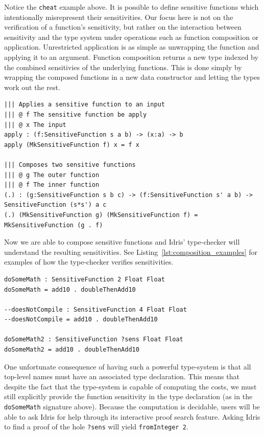 \documentclass[12pt]{article}
\begin{document}
Notice the \texttt{cheat} example above.
It is possible to define sensitive functions which intentionally misrepresent their sensitivities.
Our focus here is not on the verification of a function's sensitivity, but rather on the interaction between sensitivity and the type system under operations such as function composition or application.
Unrestricted application is as simple as unwrapping the function and applying it to an argument.
Function composition returns a new type indexed by the combined sensitivies of the underlying functions.
This is done simply by wrapping the composed functions in a new data constructor and letting the types work out the rest.

\begin{lstlisting}
||| Applies a sensitive function to an input
||| @ f The sensitive function be apply
||| @ x The input
apply : (f:SensitiveFunction s a b) -> (x:a) -> b
apply (MkSensitiveFunction f) x = f x

||| Composes two sensitive functions
||| @ g The outer function
||| @ f The inner function
(.) : (g:SensitiveFunction s b c) -> (f:SensitiveFunction s' a b) -> SensitiveFunction (s*s') a c
(.) (MkSensitiveFunction g) (MkSensitiveFunction f) = MkSensitiveFunction (g . f)
\end{lstlisting}

Now we are able to compose sensitive functions and Idris' type-checker will understand the resulting sensitivities.
See Listing~\ref{lst:composition_examples} for examples of how the type-checker verifies sensitivities.

\begin{lstlisting}[caption={Examples of Sensitive Function Composition},label={lst:composition_examples}]
doSomeMath : SensitiveFunction 2 Float Float
doSomeMath = add10 . doubleThenAdd10

--doesNotCompile : SensitiveFunction 4 Float Float
--doesNotCompile = add10 . doubleThenAdd10

doSomeMath2 : SensitiveFunction ?sens Float Float
doSomeMath2 = add10 . doubleThenAdd10
\end{lstlisting}

One unfortunate consequence of having such a powerful type-system is that all top-level names must have an associated type declaration.
This means that despite the fact that the type-system is capable of computing the costs, we must still explicitly provide the function sensitivity in the type declaration (as in the \texttt{doSomeMath} signature above).
Because the computation is decidable, users will be able to ask Idris for help through its interactive proof search feature.
Asking Idris to find a proof of the hole \texttt{?sens} will yield \texttt{fromInteger 2}.
\end{document}
